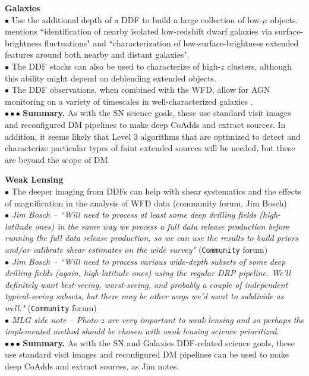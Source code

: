 \documentclass[DM,lsstdraft,toc]{lsstdoc}
\begin{document}
\noindent \textbf{Galaxies} \\
$\bullet$ Use the additional depth of a DDF to build a large collection of low-$\mu$ objects. \cite{FergusonWP} mentions ``identification of nearby isolated low-redshift dwarf galaxies via surface-brightness fluctuations" and ``characterization of low-surface-brightness extended features around both nearby and distant galaxies". \\
$\bullet$ The DDF stacks can also be used to characterize of high-$z$ clusters, although this ability might depend on deblending extended objects. \\
$\bullet$ The DDF observations, when combined with the WFD, allow for AGN monitoring on a variety of timescales in well-characterized galaxies \citep{FergusonWP,GawiserWP}. \\
$\bullet \bullet \bullet$ {\bf Summary.} As with the SN science goals, these use standard visit images and reconfigured DM pipelines to make deep CoAdds and extract sources. In addition, it seems likely that Level 3 algorithms that are optimized to detect and characterize particular types of faint extended sources will be needed, but these are beyond the scope of DM. 

\noindent \textbf{Weak Lensing} \\
$\bullet$ The deeper imaging from DDFs can help with shear systematics and the effects of magnification in the analysis of WFD data (community forum, Jim Bosch) \\
$\bullet$ {\it Jim Bosch -- ``Will need to process at least some deep drilling fields (high-latitude ones) in the same way we process a full data release production before running the full data release production, so we can use the results to build priors and/or calibrate shear estimates on the wide survey"} ({\tt \Large{Community}} forum) \\
$\bullet$ {\it Jim Bosch -- ``Will need to process various wide-depth subsets of some deep drilling fields (again, high-latitude ones) using the regular DRP pipeline. We'll definitely want best-seeing, worst-seeing, and probably a couple of independent typical-seeing subsets, but there may be other ways we'd want to subdivide as well."} ({\tt \Large{Community}} forum)  \\
$\bullet$ {\it MLG side note -- Photo-$z$ are very important to weak lensing \citep{MaWP} and so perhaps the implemented method should be chosen with weak lensing science prioritized.} \\
$\bullet \bullet \bullet$ {\bf Summary.} As with the SN and Galaxies DDF-related science goals, these use standard visit images and reconfigured DM pipelines can be used to make deep CoAdds and extract sources, as Jim notes. 
\end{document}
